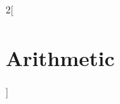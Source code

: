 \documentclass[../../../main_math.tex]{subfiles}
\begin{document}
\renewcommand{\col}{\alg}
\begin{multicols}{2}[\section{Arithmetic}]

\end{multicols}
\end{document}
